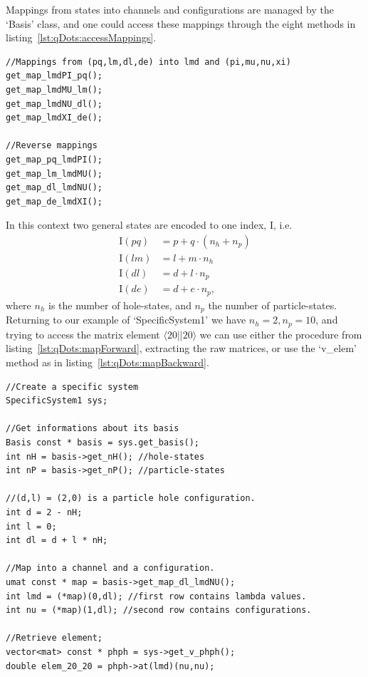 Mappings from states into channels and configurations are managed by the `Basis' class, and one could access these mappings through the eight methods  in listing~\ref{lst:qDots:accessMappings}.
\begin{lstlisting}[float,label={lst:qDots:accessMappings},caption={There are eight different mappings possible to access through the basis object.}]
//Mappings from (pq,lm,dl,de) into lmd and (pi,mu,nu,xi)
get_map_lmdPI_pq();
get_map_lmdMU_lm();
get_map_lmdNU_dl();
get_map_lmdXI_de();

//Reverse mappings 
get_map_pq_lmdPI();
get_map_lm_lmdMU();
get_map_dl_lmdNU();
get_map_de_lmdXI();
\end{lstlisting}
In this context two general states are encoded to one index, $\mathrm{I}$, i.e.
\begin{equation}
\begin{split}
\mathrm{I}(pq) &= p + q \cdot (n_h + n_p) \\
\mathrm{I}(lm) &= l + m \cdot n_h \\
\mathrm{I}(dl) &= d + l \cdot n_p \\
\mathrm{I}(de) &= d + e \cdot n_p,
\end{split}
\end{equation}
where $n_h$ is the number of hole-states, and $n_p$ the number of particle-states.
Returning to our example of `SpecificSystem1' we have $n_h=2, n_p=10$, and trying to access the matrix element $\langle 20||20 \rangle$ we can use either the procedure from listing~\ref{lst:qDots:mapForward}, extracting the raw matrices, or use the `v\_elem' method as in listing~\ref{lst:qDots:mapBackward}.
\begin{lstlisting}[float,label={lst:qDots:mapForward},caption={We try to access the element $\langle 20||20 \rangle$ by mapping the $|20\rangle$ particle-hole state into a channel and a configuration, $|\nu\rangle_{\lambda}$.},name={lst:qDots:map}]
//Create a specific system
SpecificSystem1 sys;

//Get informations about its basis
Basis const * basis = sys.get_basis();
int nH = basis->get_nH(); //hole-states
int nP = basis->get_nP(); //particle-states

//(d,l) = (2,0) is a particle hole configuration.
int d = 2 - nH;
int l = 0;
int dl = d + l * nH;

//Map into a channel and a configuration.
umat const * map = basis->get_map_dl_lmdNU();
int lmd = (*map)(0,dl); //first row contains lambda values.
int nu = (*map)(1,dl); //second row contains configurations.

//Retrieve element;
vector<mat> const * phph = sys->get_v_phph();
double elem_20_20 = phph->at(lmd)(nu,nu);
\end{lstlisting}

